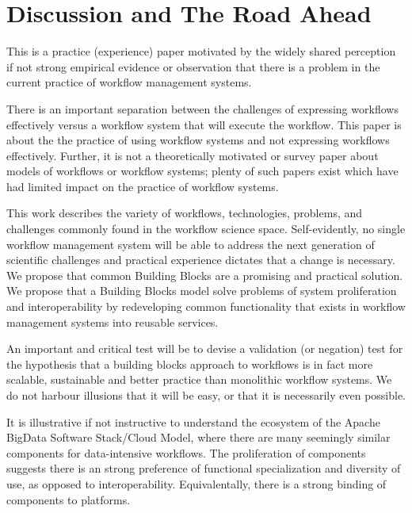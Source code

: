 \section{Discussion and The Road Ahead}\label{discussion}

This is a practice (experience) paper motivated by the widely shared
perception if not strong empirical evidence or observation that there is a
problem in the current practice of workflow management systems.

There is an important separation between the challenges of expressing workflows
effectively versus a workflow system that will execute the
workflow. This paper is about the  the practice of using workflow
systems and not expressing workflows effectively. Further, it is not a
theoretically motivated or survey paper about models of workflows or workflow
systems; plenty of such papers exist which have had limited impact on the
practice of workflow systems. 

This work describes the variety of workflows, technologies, problems, and
challenges commonly found in the workflow science space.  Self-evidently, no
single workflow management system will be able to address the next generation
of scientific challenges and practical experience dictates that a change is
necessary. We propose  that common Building Blocks are a promising and
practical solution. We propose that a Building Blocks model solve problems of
system proliferation and interoperability by redeveloping common functionality
that exists in workflow management systems into reusable services.

An important and critical test will be to devise a validation (or negation)
test for the hypothesis that a building blocks approach to workflows is in fact
more scalable, sustainable and better practice than monolithic workflow
systems. We do not harbour illusions that it will be easy, or that it is
necessarily even possible.

It is illustrative if not instructive to understand the ecosystem of the
Apache BigData Software Stack/Cloud Model, where there are many seemingly
similar components for  data-intensive workflows. The proliferation of
components suggests there is an strong preference of functional specialization
and diversity of use, as opposed to interoperability.  Equivalentally, there
is a strong binding of components to platforms.
